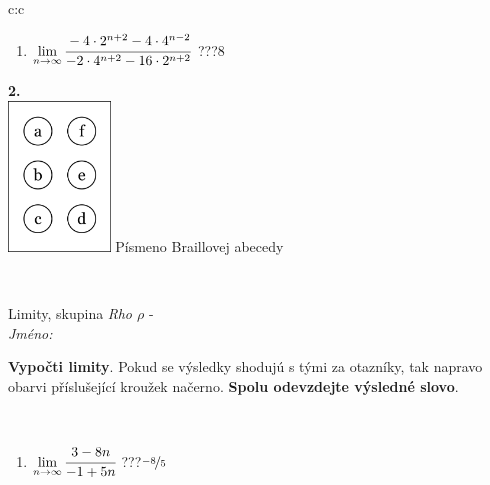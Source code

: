 \documentclass[10pt]{report}
\begin{document}
\begin{tabular}{c:c}
\begin{minipage}[c][104.5mm][t]{0.5\linewidth}
\begin{center}
\begin{minipage}{0.79\linewidth}
\begin{center}
\begin{varwidth}{\linewidth}
\begin{enumerate}
\item $\lim\limits_{n\to\infty}\cfrac{-4\cdot 2^{n+2}-4\cdot 4^{n-2}}{-2\cdot 4^{n+2}-16\cdot 2^{n+2}}$\quad \dotfill\; ???\;\dotfill \quad $8$
\end{enumerate}
\end{varwidth}
\end{center}
\end{minipage}
\begin{minipage}{0.20\linewidth}
\begin{center}
{\Huge\bfseries 2.} \\[2mm]
\includegraphics[height=40mm]{../images/braille.png}
{\small Písmeno Braillovej abecedy}
\end{center}
\end{minipage}
\end{center}
\end{minipage}
\\ \hdashline
\begin{minipage}[c][104.5mm][t]{0.5\linewidth}
\begin{center}
\vspace{7mm}
{\huge Limity, skupina \textit{Rho $\rho$} -}\\[5mm]
\textit{Jméno:}\phantom{xxxxxxxxxxxxxxxxxxxxxxxxxxxxxxxxxxxxxxxxxxxxxxxxxxxxxxxxxxxxxxxxx}\\[5mm]
\begin{minipage}{0.95\linewidth}
\begin{center}
\textbf{Vypočti limity}. Pokud se výsledky shodujú s tými za otazníky, tak napravo\\obarvi příslušející kroužek načerno. \textbf{Spolu odevzdejte výsledné slovo}.
\end{center}
\end{minipage}
\\[1mm]
\begin{minipage}{0.79\linewidth}
\begin{center}
\begin{varwidth}{\linewidth}
\begin{enumerate}
\normalsize
\item $\lim\limits_{n\to\infty}\cfrac{3-8n}{-1+5n}$\quad \dotfill\; ???\;\dotfill \quad $\nicefrac{-8}{5}$

\end{enumerate}
\end{varwidth}
\end{center}
\end{minipage}
\end{center}
\end{minipage}
\end{tabular}
\end{document}
